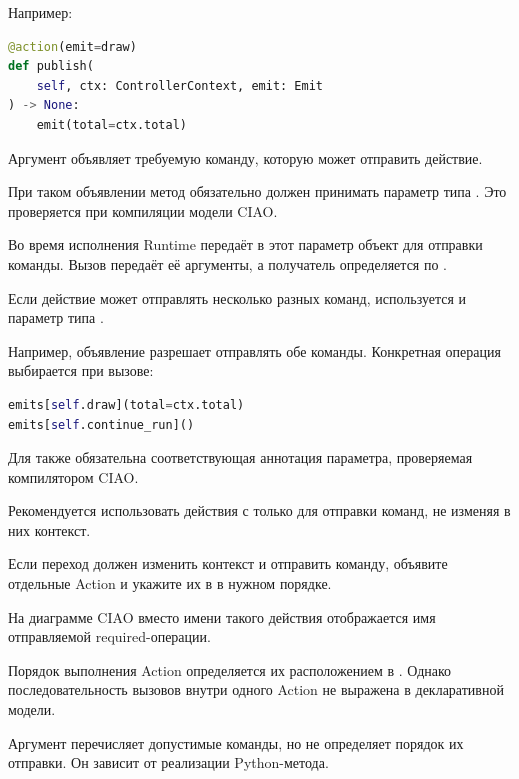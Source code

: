 Например:

\begin{lstlisting}[language=Python,numbers=none]
@action(emit=draw)
def publish(
    self, ctx: ControllerContext, emit: Emit
) -> None:
    emit(total=ctx.total)
\end{lstlisting}

Аргумент  объявляет требуемую
команду, которую может отправить действие.

При таком объявлении метод обязательно должен
принимать параметр типа .
Это проверяется при компиляции модели CIAO.

Во время исполнения Runtime передаёт в этот
параметр объект для отправки команды.
Вызов  передаёт её аргументы,
а получатель определяется по .

Если действие может отправлять несколько разных
команд, используется 
и параметр типа .

Например, объявление
разрешает отправлять обе команды. Конкретная
операция выбирается при вызове:

\begin{lstlisting}[language=Python,numbers=none]
emits[self.draw](total=ctx.total)
emits[self.continue_run]()
\end{lstlisting}

Для  также обязательна соответствующая
аннотация параметра, проверяемая компилятором CIAO.

\begin{importantbox}
Рекомендуется использовать действия с 
только для отправки команд, не изменяя в них контекст.

Если переход должен изменить контекст и отправить
команду, объявите отдельные Action и укажите их
в  в нужном порядке.

На диаграмме CIAO вместо имени такого действия
отображается имя отправляемой required-операции.
\end{importantbox}

\begin{notebox}
Порядок выполнения Action определяется их расположением
в . Однако последовательность вызовов
 внутри одного Action не выражена
в декларативной модели.

Аргумент  перечисляет допустимые
команды, но не определяет порядок их отправки.
Он зависит от реализации Python-метода.
\end{notebox}

